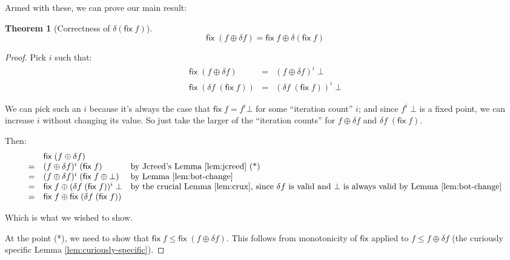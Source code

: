 \documentclass{article}
\newcommand{\ms}[1]{\ensuremath{\mathsf{#1}}}
\newtheorem{theorem}{Theorem}
\theoremstyle{definition}
\newcommand{\fix}{\ms{fix}}
\newcommand{\dv}{\delta}
\begin{document}
Armed with these, we can prove our main result:

\begin{theorem}[Correctness of $\dv(\fix\;f)$]
  \[ \fix\;(f \oplus \dv f) = \fix\;f \oplus \dv(\fix\;f) \]
\end{theorem}

\begin{proof}
  Pick $i$ such that:
  \begin{eqnarray*}
    \fix\;(f \oplus \delta f) &=& (f \oplus \dv f)^i \;\bot\\
    \fix\;(\dv f \;(\fix\;f)) &=& (\dv f\;(\fix\;f))^i \;\bot
  \end{eqnarray*}

  We can pick such an $i$ because it's always the case that $\fix\;f = f^i \bot$
  for some ``iteration count'' $i$; and since $f^i\;\bot$ is a fixed point, we
  can increase $i$ without changing its value. So just take the larger of the
  ``iteration counts'' for $f \oplus \dv f$ and $\dv f\;(\fix\;f)$.

  Then:
  \[
  \begin{array}{cll}
     & \fix\;(f \oplus \dv f)\\
    =& (f \oplus \dv f)^i \; (\fix\;f)
    & \text{by Jcreed's Lemma \ref{lem:jcreed} (*)}\\
    =& (f \oplus \dv f)^i \; (\fix\;f \oplus \bot)
    & \text{by Lemma \ref{lem:bot-change}}\\
    =& \fix\;f \oplus (\dv f \;(\fix\;f))^i \;\bot
    & \text{by the crucial Lemma \ref{lem:crux}, since $\dv f$ is valid and $\bot$ is always valid by Lemma \ref{lem:bot-change}}\\
    =& \fix\;f \oplus \fix\;(\dv f\;(\fix\;f))
  \end{array}
  \]

  Which is what we wished to show.

  At the point (*), we need to show that $\fix\; f \le \fix\; (f \oplus \dv f)$.
  This follows from monotonicity of $\fix$ applied to $f \le f \oplus \dv f$
  (the curiously specific Lemma \ref{lem:curiously-specific}).

\end{proof}
\end{document}
